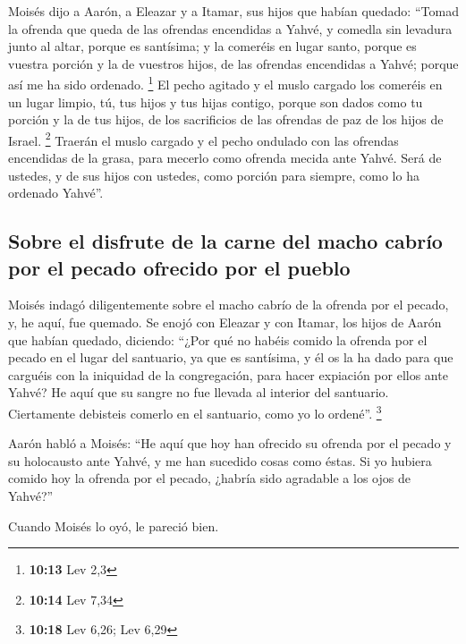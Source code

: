 \begin{paracol}{2}
 Moisés dijo a Aarón, a Eleazar y a Itamar, sus hijos que
habían quedado: ``Tomad la ofrenda que queda de las ofrendas encendidas
a Yahvé, y comedla sin levadura junto al altar, porque es santísima;
 y la comeréis en lugar santo, porque es vuestra porción
y la de vuestros hijos, de las ofrendas encendidas a Yahvé; porque así
me ha sido ordenado. \footnote{\textbf{10:13} Lev 2,3} 
El pecho agitado y el muslo cargado los comeréis en un lugar limpio, tú,
tus hijos y tus hijas contigo, porque son dados como tu porción y la de
tus hijos, de los sacrificios de las ofrendas de paz de los hijos de
Israel. \footnote{\textbf{10:14} Lev 7,34}  Traerán el
muslo cargado y el pecho ondulado con las ofrendas encendidas de la
grasa, para mecerlo como ofrenda mecida ante Yahvé. Será de ustedes, y
de sus hijos con ustedes, como porción para siempre, como lo ha ordenado
Yahvé''.

\hypertarget{sobre-el-disfrute-de-la-carne-del-macho-cabruxedo-por-el-pecado-ofrecido-por-el-pueblo}{%
\subsection{Sobre el disfrute de la carne del macho cabrío por el pecado
ofrecido por el
pueblo}\label{sobre-el-disfrute-de-la-carne-del-macho-cabruxedo-por-el-pecado-ofrecido-por-el-pueblo}}

 Moisés indagó diligentemente sobre el macho cabrío de la
ofrenda por el pecado, y, he aquí, fue quemado. Se enojó con Eleazar y
con Itamar, los hijos de Aarón que habían quedado, diciendo:
 ``¿Por qué no habéis comido la ofrenda por el pecado en
el lugar del santuario, ya que es santísima, y él os la ha dado para que
carguéis con la iniquidad de la congregación, para hacer expiación por
ellos ante Yahvé?  He aquí que su sangre no fue llevada
al interior del santuario. Ciertamente debisteis comerlo en el
santuario, como yo lo ordené''. \footnote{\textbf{10:18} Lev 6,26; Lev
  6,29}

 Aarón habló a Moisés: ``He aquí que hoy han ofrecido su
ofrenda por el pecado y su holocausto ante Yahvé, y me han sucedido
cosas como éstas. Si yo hubiera comido hoy la ofrenda por el pecado,
¿habría sido agradable a los ojos de Yahvé?''

 Cuando Moisés lo oyó, le pareció bien.

\switchcolumn
\begin{otherlanguage}{english}


\end{otherlanguage}
\end{paracol}
